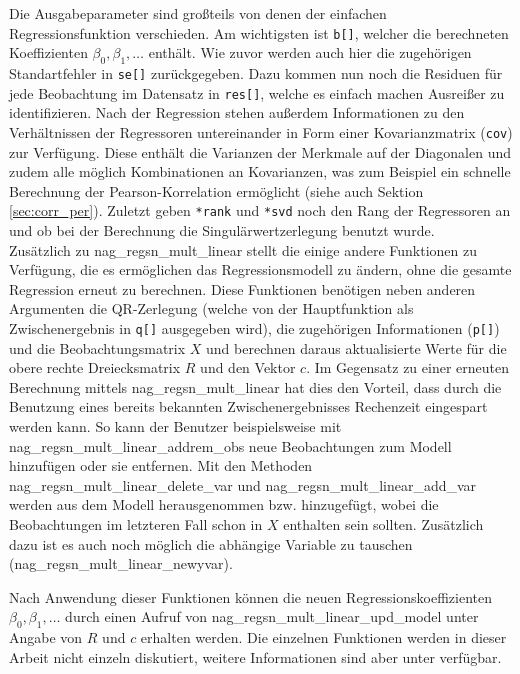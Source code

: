 Die Ausgabeparameter sind großteils von denen der einfachen Regressionsfunktion verschieden.
Am wichtigsten ist \lstinline{b[]}, welcher die berechneten Koeffizienten $\beta_0, \beta_1, \dots$ enthält.
Wie zuvor werden auch hier die zugehörigen Standartfehler in \lstinline{se[]} zurückgegeben.
Dazu kommen nun noch die Residuen für jede Beobachtung im Datensatz in \lstinline{res[]}, welche es einfach machen Ausreißer zu identifizieren.
Nach der Regression stehen außerdem Informationen zu den Verhältnissen der Regressoren untereinander in Form einer Kovarianzmatrix (\lstinline{cov}) zur Verfügung.
Diese enthält die Varianzen der Merkmale auf der Diagonalen und zudem alle möglich Kombinationen an Kovarianzen, was zum Beispiel ein schnelle Berechnung der Pearson-Korrelation ermöglicht (siehe auch Sektion \ref{sec:corr_per}).
Zuletzt geben \lstinline{*rank} und \lstinline{*svd} noch den Rang der Regressoren an und ob bei der Berechnung die Singulärwertzerlegung benutzt wurde.
\\

Zusätzlich zu nag\_regsn\_mult\_linear stellt die \naglib einige andere Funktionen zu Verfügung, die es ermöglichen das Regressionsmodell zu ändern, ohne die gesamte Regression erneut zu berechnen.
Diese Funktionen benötigen neben anderen Argumenten die QR-Zerlegung (welche von der Hauptfunktion als Zwischenergebnis in \lstinline{q[]} ausgegeben wird), die zugehörigen Informationen (\lstinline{p[]}) und die Beobachtungsmatrix $X$ und berechnen daraus aktualisierte Werte für die obere rechte Dreiecksmatrix $R$ und den Vektor $c$.
Im Gegensatz zu einer erneuten Berechnung mittels nag\_regsn\_mult\_linear hat dies den Vorteil, dass durch die Benutzung eines bereits bekannten Zwischenergebnisses Rechenzeit eingespart werden kann.
So kann der Benutzer beispielsweise mit nag\_regsn\_mult\_linear\_addrem\_obs neue Beobachtungen zum Modell hinzufügen oder sie entfernen.
Mit den Methoden nag\_regsn\_mult\_linear\_delete\_var und nag\_regsn\_mult\_linear\_add\_var werden aus dem Modell herausgenommen bzw. hinzugefügt, wobei die Beobachtungen im letzteren Fall schon in $X$ enthalten sein sollten.
Zusätzlich dazu ist es auch noch möglich die abhängige Variable zu tauschen (nag\_regsn\_mult\_linear\_newyvar).

Nach Anwendung dieser Funktionen können die neuen Regressionskoeffizienten $\beta_0, \beta_1, \dots$ durch einen Aufruf von nag\_regsn\_mult\_linear\_upd\_model unter Angabe von $R$ und $c$ erhalten werden.
Die einzelnen Funktionen werden in dieser Arbeit nicht einzeln diskutiert, weitere Informationen sind aber unter \citep{nag:contents} verfügbar.






